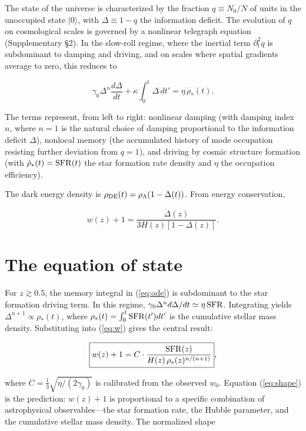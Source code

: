 \documentclass[12pt,a4paper]{article}
\begin{document}
\vspace{4pt}
The state of the universe is characterized by the fraction $q\equiv N_0/N$ of units in the unoccupied state $|0\rangle$, with $\Delta\equiv 1-q$ the information deficit. The evolution of $q$ on cosmological scales is governed by a nonlinear telegraph equation (Supplementary \S2). In the slow-roll regime, where the inertial term $\partial_t^2 q$ is subdominant to damping and driving, and on scales where spatial gradients average to zero, this reduces to

\begin{equation}\label{eq:ode}
\gamma_0 \Delta^n\frac{d\Delta}{dt} + \kappa\int_0^t\Delta\,dt' = \eta\,\dot{\rho}_*(t).
\end{equation}

The terms represent, from left to right: nonlinear damping (with damping index $n$, where $n=1$ is the natural choice of damping proportional to the information deficit $\Delta$), nonlocal memory (the accumulated history of mode occupation resisting further deviation from $q=1$), and driving by cosmic structure formation (with $\dot{\rho}_*(t)={\rm SFR}(t)$ the star formation rate density and $\eta$ the occupation efficiency).

The dark energy density is $\rho_{\rm DE}(t)=\rho_\Lambda(1-\Delta(t))$. From energy conservation,

\begin{equation}\label{eq:w}
w(z)+1 = \frac{\dot{\Delta}(z)}{3H(z)[1-\Delta(z)]}.
\end{equation}

\section*{The equation of state}

For $z\gtrsim0.5$, the memory integral in (\ref{eq:ode}) is subdominant to the star formation driving term. In this regime, $\gamma_0\Delta^n d\Delta/dt\simeq\eta\,{\rm SFR}$. Integrating yields $\Delta^{n+1}\propto\rho_*(t)$, where $\rho_*(t)=\int_0^t{\rm SFR}(t')dt'$ is the cumulative stellar mass density. Substituting into (\ref{eq:w}) gives the central result:

\begin{equation}\label{eq:shape}
\boxed{w(z)+1 = C\cdot\frac{{\rm SFR}(z)}{H(z)\,\rho_*(z)^{n/(n+1)}}},
\end{equation}

where $C=\frac{1}{3}\sqrt{\eta/(2\gamma_0)}$ is calibrated from the observed $w_0$. Equation (\ref{eq:shape}) is the prediction: $w(z)+1$ is proportional to a specific combination of astrophysical observables---the star formation rate, the Hubble parameter, and the cumulative stellar mass density. The normalized shape
\end{document}
